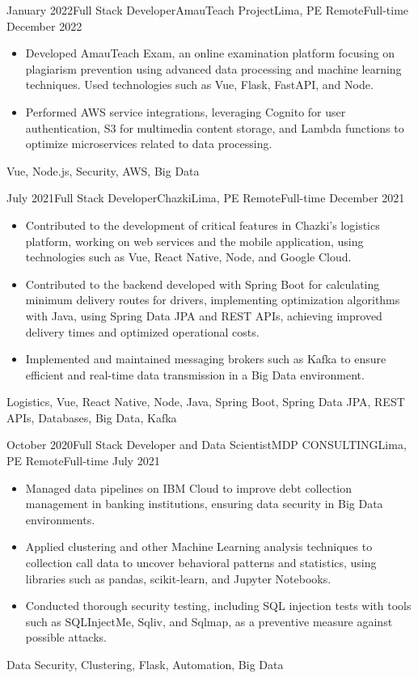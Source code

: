 \begin{experiences}
\emptySeparator
\experience
  {January 2022}{Full Stack Developer}{AmauTeach Project}{Lima, PE}
  {Remote}{Full-time}
  {December 2022} {
    \begin{itemize}
      \item Developed AmauTeach Exam, an online examination platform focusing on plagiarism prevention using advanced data processing and machine learning techniques. Used technologies such as Vue, Flask, FastAPI, and Node.
      \item Performed AWS service integrations, leveraging Cognito for user authentication, S3 for multimedia content storage, and Lambda functions to optimize microservices related to data processing.
    \end{itemize}
  }
  {Vue, Node.js, Security, AWS, Big Data}

\emptySeparator
\experience
  {July 2021}{Full Stack Developer}{Chazki}{Lima, PE}
  {Remote}{Full-time}
  {December 2021} {
    \begin{itemize}
      \item Contributed to the development of critical features in Chazki's logistics platform, working on web services and the mobile application, using technologies such as Vue, React Native, Node, and Google Cloud.
      \item Contributed to the backend developed with Spring Boot for calculating minimum delivery routes for drivers, implementing optimization algorithms with Java, using Spring Data JPA and REST APIs, achieving improved delivery times and optimized operational costs.
      \item Implemented and maintained messaging brokers such as Kafka to ensure efficient and real-time data transmission in a Big Data environment.
    \end{itemize}
  }
  {Logistics, Vue, React Native, Node, Java, Spring Boot, Spring Data JPA, REST APIs, Databases, Big Data, Kafka}

\emptySeparator
\experience
  {October 2020}{Full Stack Developer and Data Scientist}{MDP CONSULTING}{Lima, PE}
  {Remote}{Full-time}
  {July 2021} {
    \begin{itemize}
      \item Managed data pipelines on IBM Cloud to improve debt collection management in banking institutions, ensuring data security in Big Data environments.
      \item Applied clustering and other Machine Learning analysis techniques to collection call data to uncover behavioral patterns and statistics, using libraries such as pandas, scikit-learn, and Jupyter Notebooks.
      \item Conducted thorough security testing, including SQL injection tests with tools such as SQLInjectMe, Sqliv, and Sqlmap, as a preventive measure against possible attacks.
    \end{itemize}
  }
  {Data Security, Clustering, Flask, Automation, Big Data}


\end{experiences}

